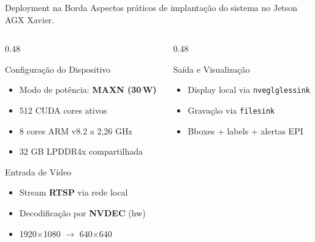 \begin{frame}{Deployment na Borda}
  \vspace{-2mm}
  \centering
  {\small Aspectos práticos de implantação do sistema no Jetson AGX Xavier.}

  \vspace{1mm}

  \begin{columns}[t]
    \begin{column}{0.48\textwidth}
      \begin{block}{\scriptsize Configuração do Dispositivo}
        \begin{itemize}\scriptsize
          \setlength{\itemsep}{0pt}
          \item Modo de potência: \textbf{MAXN (30\,W)}
          \item 512 CUDA cores ativos
          \item 8 cores ARM v8.2 a 2,26 GHz
          \item 32 GB LPDDR4x compartilhada
        \end{itemize}
      \end{block}

      \begin{block}{\scriptsize Entrada de Vídeo}
        \begin{itemize}\scriptsize
          \setlength{\itemsep}{0pt}
          \item Stream \textbf{RTSP} via rede local
          \item Decodificação por \textbf{NVDEC} (hw)
          \item 1920$\times$1080 $\to$ 640$\times$640
        \end{itemize}
      \end{block}
    \end{column}

    \begin{column}{0.48\textwidth}
      \begin{block}{\scriptsize Saída e Visualização}
        \begin{itemize}\scriptsize
          \setlength{\itemsep}{0pt}
          \item Display local via \texttt{nveglglessink}
          \item Gravação via \texttt{filesink}
          \item Bboxes + labels + alertas EPI
        \end{itemize}
      \end{block}


\end{column}
\end{columns}
\end{frame}
